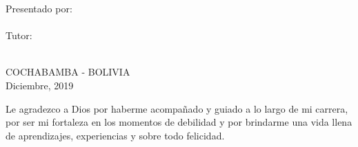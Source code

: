\documentclass[11pt,spanish,singlespacing,headsepline]{MastersDoctoralThesis}
\begin{document}
\begin{titlepage}
\begin{center}
{\Large Presentado por:}\\

\hspace{ 0.55\textwidth} \Large{\authorname}\\

\hspace{ -0.14\textwidth} {\Large Tutor:}\\

\hspace{ 0.55\textwidth} {\Large{\supname}}\\

\hspace{ 0.35\textwidth} 
\end{center}

\vspace*{0.2cm}
 
\begin{center}
\vspace*{1.5cm}
\Large{COCHABAMBA - BOLIVIA}\hspace*{1cm}\Large{\\Diciembre, 2019}	
\end{center}	
	
\end{titlepage}

\cleardoublepage


\begin{acknowledgements}
\addchaptertocentry{\acknowledgementname} 
\bigskip
Le agradezco a Dios por haberme acompañado y guiado a lo largo de mi carrera, por ser mi fortaleza en los momentos de debilidad y por brindarme una vida llena de aprendizajes, experiencias y sobre todo felicidad.
\end{acknowledgements}



\end{document}
